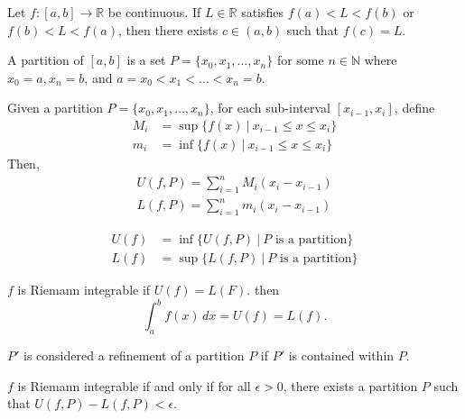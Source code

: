\documentclass{article}
\begin{document}
\medskip
{}
    
    Let $f: [a,b] \to \mathbb R$ be continuous. If $L \in \mathbb R$ satisfies $f(a) < L < f(b)$ or $f(b) < L < f(a)$, then there exists $c \in (a,b)$ such that $f(c) = L$.

\medskip
{}

    A partition of $[a,b]$ is a set $P = \{x_0, x_1, \hdots, x_n\}$ for some $n \in \mathbb N$ where $x_0 = a, x_n = b$, and $a = x_0 < x_1 < \hdots < x_n = b$.

\medskip
{}

    Given a partition $P = \{x_0, x_1, \hdots, x_n\}$, for each sub-interval $[x_{i-1}, x_i]$, define
    \begin{align*}
        M_i &= \sup\{f(x) ~|~ x_{i-1} \leq x \leq x_i\} \\
        m_i &= \inf\{f(x) ~|~ x_{i-1} \leq x \leq x_i\}
    \end{align*} Then,
    \begin{align*}
        U(f, P) = \sum_{i=1}^nM_i(x_i-x_{i-1}) \\
        L(f, P) = \sum_{i=1}^nm_i(x_i-x_{i-1})
    \end{align*}

\medskip
{}

    \begin{align*}
        U(f) &= \inf\{U(f,P) ~|~ P \text{ is a partition} \} \\
        L(f) &= \sup\{L(f,P) ~|~ P \text{ is a partition} \}
    \end{align*}



    $f$ is Riemann integrable if $U(f) = L(F)$. then $$\int_a^b f(x)\,dx = U(f) = L(f).$$

\medskip
{}

    $P'$ is considered a refinement of a partition $P$ if $P'$ is contained within $P$.

\medskip
{}

    $f$ is Riemann integrable if and only if for all $\epsilon > 0$, there exists a partition $P$ such that $U(f, P) - L(f, P) < \epsilon$.
\end{document}
